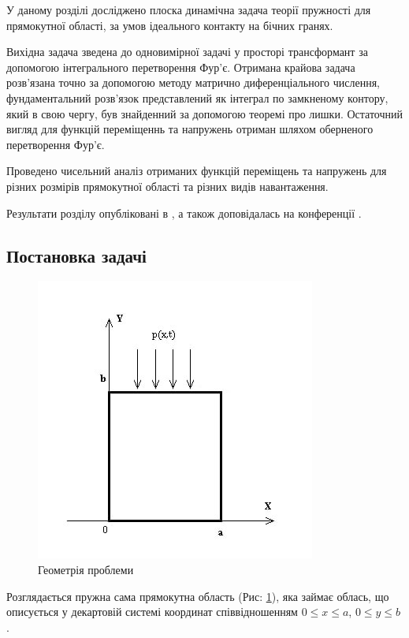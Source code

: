 У даному розділі досліджено плоска динамічна задача теорії пружності для прямокутної області,
за умов ідеального контакту на бічних гранях.

Вихідна задача зведена до одновимірної задачі у просторі трансформант за допомогою інтегрального перетворення Фур'є.
Отримана крайова задача розв'язана точно за допомогою методу матрично диференціального числення,
фундаментальний розв'язок представлений як інтеграл по замкненому контору, який в свою чергу, був знайденний за допомогою теоремі про лишки.
Остаточний вигляд для функцій переміщеннь та напружень отриман шляхом оберненого перетворення Фур'є.

Проведено чисельний аналіз отриманих функцій переміщень та напружень для різних розмірів прямокутної області та різних видів навантаження.

Результати розділу опубліковані в \cite{pozhylenkov_5}, а також доповідалась на конференції \cite{conf_4}.

\subsection{Постановка задачі}
\begin{figure}[h]
    \begin{center}
        \includegraphics[scale=1]{images/geometry/image_4.jpg}
    \end{center}
    \caption{Геометрія проблеми}\label{geom_dynamic_1}
\end{figure}
Розглядається пружна сама прямокутна область (Рис: \ref{geom_dynamic_1}), яка займає облась,
що описується у декартовій системі координат співвідношенням $0 \le x \le a$, $0 \le y \le b$.

